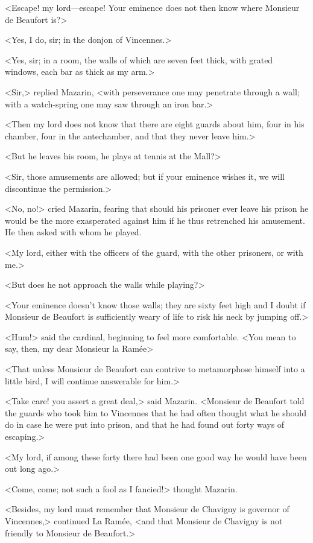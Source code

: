 <Escape! my lord—escape! Your eminence does not then know where Monsieur de Beaufort is?>

<Yes, I do, sir; in the donjon of Vincennes.>

<Yes, sir; in a room, the walls of which are seven feet thick, with grated windows, each bar as thick as my arm.>

<Sir,> replied Mazarin, <with perseverance one may penetrate through a wall; with a watch-spring one may saw through an iron bar.>

<Then my lord does not know that there are eight guards about him, four in his chamber, four in the antechamber, and that they never leave him.>

<But he leaves his room, he plays at tennis at the Mall?>

<Sir, those amusements are allowed; but if your eminence wishes it, we will discontinue the permission.>

<No, no!> cried Mazarin, fearing that should his prisoner ever leave his prison he would be the more exasperated against him if he thus retrenched his amusement. He then asked with whom he played.

<My lord, either with the officers of the guard, with the other prisoners, or with me.>

<But does he not approach the walls while playing?>

<Your eminence doesn't know those walls; they are sixty feet high and I doubt if Monsieur de Beaufort is sufficiently weary of life to risk his neck by jumping off.>

<Hum!> said the cardinal, beginning to feel more comfortable. <You mean to say, then, my dear Monsieur la Ramée\longdash>

<That unless Monsieur de Beaufort can contrive to metamorphose himself into a little bird, I will continue answerable for him.>

<Take care! you assert a great deal,> said Mazarin. <Monsieur de Beaufort told the guards who took him to Vincennes that he had often thought what he should do in case he were put into prison, and that he had found out forty ways of escaping.>

<My lord, if among these forty there had been one good way he would have been out long ago.>

<Come, come; not such a fool as I fancied!> thought Mazarin.

<Besides, my lord must remember that Monsieur de Chavigny is governor of Vincennes,> continued La Ramée, <and that Monsieur de Chavigny is not friendly to Monsieur de Beaufort.>

